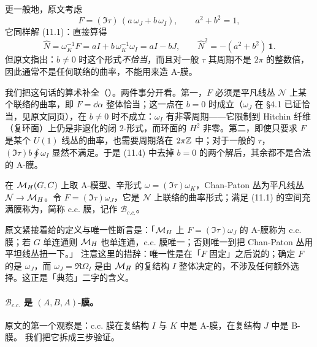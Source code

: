 更一般地，原文考虑
\begin{equation}
F=(\Im\tau)\,(a\,\omega_J+b\,\omega_I),\qquad a^2+b^2=1,
\label{eq:family}
\end{equation}
它同样解 (11.1)：直接算得
\begin{equation}
\hat N=\omega_K^{-1}F=aI+b\,\omega_K^{-1}\omega_I=aI-bJ,
\qquad \hat N^2=-(a^2+b^2)\,\mathbf 1.
\label{eq:N-family}
\end{equation}
但原文指出：\(b\neq0\) 时这个形式\emph{不恰当}，而且对一般 \(\tau\) 其周期不是 \(2\pi\) 的整数倍，因此通常不是任何联络的曲率，不能用来造 A-膜。\pA{}

我们把这句话的算术补全（\pB）。两件事分开看。第一，\(F\) 必须是平凡线丛 \(\mathcal N\) 上某个联络的曲率，即 \(F=\dd\alpha\) 整体恰当；这一点在 \(b=0\) 时成立（\(\omega_J\) 在 \S4.1 已证恰当，见原文同页），在 \(b\neq0\) 时不成立：\(\omega_I\) 有非零周期——它限制到 Hitchin 纤维（复环面）上仍是非退化的闭 2-形式，而环面的 \(H^2\) 非零。第二，即使只要求 \(F\) 是某个 \(U(1)\) 线丛的曲率，也需要周期落在 \(2\pi\mathbb{Z}\) 中；对于一般的 \(\tau\)，\((\Im\tau)b\oint\omega_I\) 显然不满足。于是 (11.4) 中去掉 \(b=0\) 的两个解后，其余都不是合法的 A-膜。\pB{}

\begin{definition}[典范余各向同性膜]
\label{def:cc-brane}
在 \(\mathcal{M}_H(G,C)\) 上取 A-模型、辛形式 \(\omega=(\Im\tau)\omega_K\)，Chan-Paton 丛为平凡线丛 \(\mathcal N\to\mathcal{M}_H\)。令 \(F=(\Im\tau)\omega_J\)，它是 \(\mathcal N\) 上联络的曲率形式；满足 (11.1) 的空间充满膜称为，简称 c.c. 膜，记作 \(\mathcal B_{c.c.}\)。
\end{definition}

原文紧接着给的定义与唯一性断言是：「\(\mathcal{M}_H\) 上 \(F=(\Im\tau)\omega_J\) 的 A-膜称为 c.c. 膜；若 \(G\) 单连通则 \(\mathcal{M}_H\) 也单连通，c.c. 膜唯一；否则唯一到把 Chan-Paton 丛用平坦线丛扭一下。」\pA{} 注意这里的措辞：唯一性是在「\(F\) 固定」之后说的；确定 \(F\) 的是 \(\omega_J\)，而 \(\omega_J=\Re\Omega_I\) 是由 \(\mathcal{M}_H\) 的复结构 \(I\) 整体决定的，不涉及任何额外选择。这正是「典范」二字的含义。

\paragraph{\(\mathcal B_{c.c.}\) 是 \((A,B,A)\)-膜。}原文的第一个观察是：c.c. 膜在复结构 \(I\) 与 \(K\) 中是 A-膜，在复结构 \(J\) 中是 B-膜。\pA{} 我们把它拆成三步验证。

